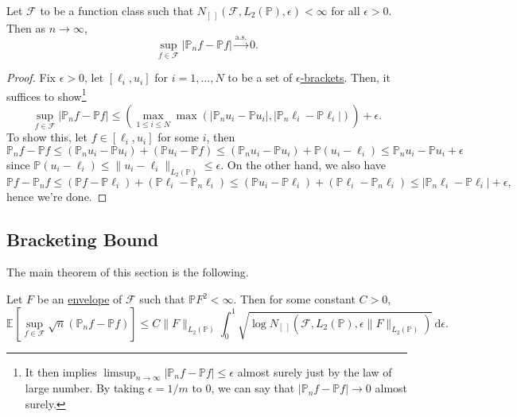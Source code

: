 \begin{proposition}
	Let \(\mathscr{F} \) to be a function class such that \(N_{[\ ]}(\mathscr{F} , L_2(\mathbb{P} ), \epsilon ) < \infty \) for all \(\epsilon > 0\). Then as \(n\to \infty \),
	\[
		\sup _{f\in\mathscr{F} } \vert \mathbb{P} _n f - \mathbb{P} f \vert \overset{\text{a.s.} }{\to } 0.
	\]
\end{proposition}
\begin{proof}
	Fix \(\epsilon > 0\), let \([\ell _i, u_i]\) for \(i = 1, \dots , N\) to be a set of \hyperref[def:eps-bracket]{\(\epsilon \)-brackets}. Then, it suffices to show\footnote{It then implies \(\limsup_{n \to \infty} \vert \mathbb{P} _n f - \mathbb{P} f \vert \leq \epsilon \) almost surely just by the law of large number. By taking \(\epsilon = 1 / m\) to \(0\), we can say that \(\vert \mathbb{P} _n f - \mathbb{P} f \vert \to 0\) almost surely.}
	\[
		\sup _{f\in \mathscr{F} } \vert \mathbb{P} _n f - \mathbb{P} f \vert
		\leq \left( \max _{1 \leq i \leq N } \max (\vert \mathbb{P} _n u_i - \mathbb{P} u_i \vert , \vert \mathbb{P} _n \ell _i - \mathbb{P} \ell _i \vert ) \right) + \epsilon.
	\]
	To show this, let \(f\in [\ell _i, u_i]\) for some \(i\), then
	\[
		\mathbb{P} _n f - \mathbb{P} f
		\leq (\mathbb{P} _n u_i - \mathbb{P} u_i) + (\mathbb{P} u_i - \mathbb{P} f)
		\leq (\mathbb{P} _n u_i - \mathbb{P} u_i) + \mathbb{P} (u_i - \ell _i)
		\leq \mathbb{P} _n u_i - \mathbb{P} u_i + \epsilon
	\]
	since \(\mathbb{P} (u_i - \ell _i) \leq \lVert u_i - \ell _i \rVert _{L_2(\mathbb{P} )} \leq \epsilon \). On the other hand, we also have
	\[
		\mathbb{P} f - \mathbb{P} _n f
		\leq (\mathbb{P} f - \mathbb{P} \ell _i) + (\mathbb{P} \ell _i - \mathbb{P} _n \ell _i)
		\leq (\mathbb{P} u_i - \mathbb{P} \ell _i) + (\mathbb{P} \ell _i - \mathbb{P} _n \ell _i)
		\leq \vert \mathbb{P} _n \ell _i - \mathbb{P} \ell _i \vert + \epsilon,
	\]
	hence we're done.
\end{proof}

\subsection{Bracketing Bound}
The main theorem of this section is the following.

\begin{theorem}\label{thm:bracketing-bound}
	Let \(F\) be an \hyperref[def:envelope]{envelope} of \(\mathscr{F} \) such that \(\mathbb{P} F^2 < \infty \). Then for some constant \(C > 0\),
	\[
		\mathbb{E}_{}\left[\sup _{f\in \mathscr{F} } \sqrt{n} (\mathbb{P} _n f - \mathbb{P} f) \right]
		\leq C \lVert F \rVert _{L_2(\mathbb{P} )} \int_{0}^{1} \sqrt{\log N_{[\ ]}(\mathscr{F} , L_2(\mathbb{P} ), \epsilon \lVert F \rVert _{L_2(\mathbb{P} )})}  \,\mathrm{d}\epsilon .
	\]
\end{theorem}

